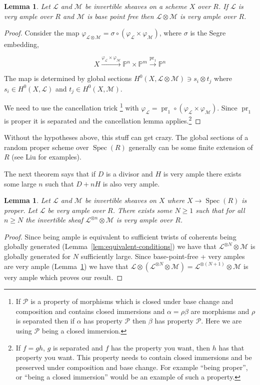 \documentclass[12pt]{article}
\numberwithin{equation}{section}
\newtheorem{lemma}[theorem]{Lemma}
\theoremstyle{definition}
\theoremstyle{remark}
\newcommand{\PP}{\mathbb{P}}
\newcommand{\Spec}{\operatorname{Spec}}
\newcommand{\Lcal}{\mathcal{L}}
\newcommand{\Mcal}{\mathcal{M}}
\newcommand{\Pcal}{\mathcal{P}}
\newcommand{\pr}{\operatorname{pr}}
\begin{document}
\begin{lemma}\label{lem:glob-gen+very-ample}
	Let $\Lcal$ and $\Mcal$ be invertible sheaves on a scheme $X$ over $R$. 
	If $\Lcal$ is very ample over $R$ and $\Mcal$ is base point free then $\Lcal\otimes \Mcal$ is very ample over $R$.
\end{lemma}
\begin{proof}
	Consider the map $\varphi_{\Lcal\otimes \Mcal} = \sigma\circ(\varphi_{\Lcal}\times \varphi_{\Mcal})$, where $\sigma$ is the Segre embedding,
	
	$$ X \xrightarrow{\varphi_{\Lcal}\times\varphi_{\Mcal}} \PP^n \times \PP^m \xrightarrow{\pr_1} \PP^n $$
	
	The map is determined by global sections $H^0(X,\Lcal\otimes \Mcal) \owns s_i\otimes t_j$ where $s_i \in H^0(X,\Lcal)$ and $t_j \in H^0(X,\Mcal)$. 
	
	We need to use the cancellation trick \footnote{
		If $\Pcal$ is a property of morphisms which is closed under base change and composition and contains closed immersions and $\alpha = \rho \beta$ are morphisms and $\rho$ is separated then if $\alpha$ has property $\Pcal$ then $\beta$ has property $\Pcal$. 
		Here we are using $\Pcal$ being a closed immersion.
	} 
with $\varphi_{\Lcal} = \pr_1\circ(\varphi_{\Lcal}\times\varphi_{\Mcal})$. 
	Since $\pr_1$ is proper it is separated and the cancellation lemma applies.\footnote{
		If $f=gh$, $g$ is separated and $f$ has the property you want, then $h$ has that property you want. This property needs to contain closed immersions and be preserved under composition and base change. 
		For example ``being proper'', or ``being a closed immersion'' would be an example of such a property.
	}
	
\end{proof}
Without the hypotheses above, this stuff can get crazy.
The global sections of a random proper scheme over $\Spec(R)$ generally can be some finite extension of $R$ (see Liu for examples).

The next theorem says that if $D$ is a divisor and $H$ is very ample there exists some large $n$ such that $D+nH$ is also very ample.
\begin{lemma}\label{thm:adding-multiple-of-very-ample}
	Let $\Lcal$ and $\Mcal$ be invertible sheaves on $X$ where $X \to \Spec(R)$ is proper. 
	Let $\Lcal$ be very ample over $R$. 
	There exists some $N\geq 1$ such that for all $n\geq N$ the invertible sheaf $\Lcal^{\otimes n} \otimes \Mcal$ is very ample over $R$.
\end{lemma}
\begin{proof}
	Since being ample is equivalent to sufficient twists of coherents being globally generated (Lemma~\ref{lem:equivalent-conditions}) we have that $\Lcal^{\otimes N} \otimes \Mcal$ is globally generated for $N$ sufficiently large. 
	Since base-point-free + very amples are very ample (Lemma~\ref{lem:glob-gen+very-ample}) we have that $\Lcal \otimes (\Lcal^{\otimes N} \otimes \Mcal) =\Lcal^{\otimes(N+1)}\otimes \Mcal$ is very ample which proves our result. 
\end{proof}
\end{document}

